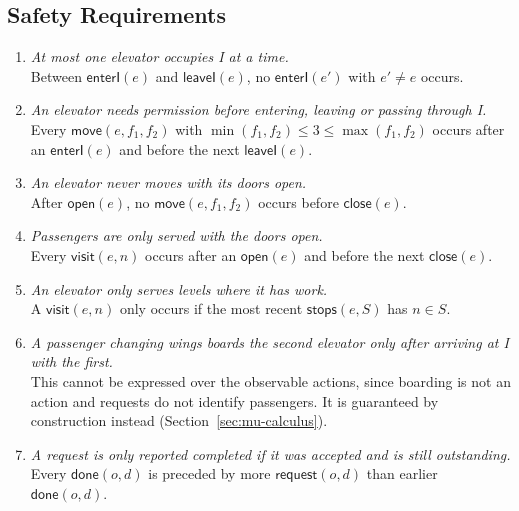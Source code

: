 \subsection{Safety Requirements}
\begin{enumerate}[label=\textbf{S\arabic*.},leftmargin=3em,itemsep=0.45\baselineskip]
  \item \textit{At most one elevator occupies I at a time.} \\
  Between \(\mathsf{enterI}(e)\) and \(\mathsf{leaveI}(e)\), no \(\mathsf{enterI}(e')\) with \(e'\neq e\) occurs.
  
  \item \textit{An elevator needs permission before entering, leaving or passing through I.} \\
  Every \(\mathsf{move}(e,f_1,f_2)\) with \(\min(f_1,f_2)\leq 3\leq\max(f_1,f_2)\) occurs after an \(\mathsf{enterI}(e)\) and before the next \(\mathsf{leaveI}(e)\).
  
  \item \textit{An elevator never moves with its doors open.} \\
  After \(\mathsf{open}(e)\), no \(\mathsf{move}(e,f_1,f_2)\) occurs before \(\mathsf{close}(e)\).
  
  \item \textit{Passengers are only served with the doors open.} \\
  Every \(\mathsf{visit}(e,n)\) occurs after an \(\mathsf{open}(e)\) and before the next \(\mathsf{close}(e)\).
  
  \item \textit{An elevator only serves levels where it has work.} \\
  A \(\mathsf{visit}(e,n)\) only occurs if the most recent \(\mathsf{stops}(e,S)\) has \(n\in S\).
  
  \item \textit{A passenger changing wings boards the second elevator only after arriving at I with the first.} \\
  This cannot be expressed over the observable actions, since boarding is not an action and requests do not identify passengers. It is guaranteed by construction instead (Section~\ref{sec:mu-calculus}).
 
  \item \textit{A request is only reported completed if it was accepted and is still outstanding.} \\
  Every \(\mathsf{done}(o,d)\) is preceded by more \(\mathsf{request}(o,d)\) than earlier \(\mathsf{done}(o,d)\).
 

\end{enumerate}
